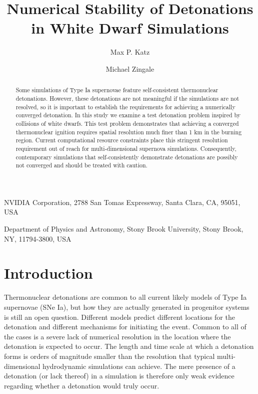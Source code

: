 \documentclass[twocolumn,numberedappendix,trackchanges]{../aastex62}
\begin{document}
\title{Numerical Stability of Detonations in White Dwarf Simulations}


\author{Max P. Katz}
\affiliation
{
  NVIDIA Corporation, 2788 San Tomas Expressway, Santa Clara, CA, 95051, USA
}

\author{Michael Zingale}
\affiliation
{
  Department of Physics and Astronomy, Stony Brook University, Stony Brook, NY, 11794-3800, USA
}



\begin{abstract}
Some simulations of Type Ia supernovae feature self-consistent thermonuclear
detonations. However, these detonations are not meaningful if the simulations
are not resolved, so it is important to establish the requirements for achieving
a numerically converged detonation. In this study we examine a test detonation
problem inspired by collisions of white dwarfs. This test problem demonstrates
that achieving a converged thermonuclear ignition requires spatial resolution
much finer than 1 km in the burning region. Current computational resource
constraints place this stringent resolution requirement out of reach for
multi-dimensional supernova simulations. Consequently, contemporary simulations
that self-consistently demonstrate detonations are possibly not converged
and should be treated with caution.
\end{abstract}

\section{Introduction}
\label{sec:introduction}

Thermonuclear detonations are common to all current likely models of Type Ia
supernovae (SNe Ia), but how they are actually generated in progenitor systems
is still an open question. Different models predict different locations for
the detonation and different mechanisms for initiating the event. Common to all
of the cases is a severe lack of numerical resolution in the location where the
detonation is expected to occur. The length and time scale at which a detonation
forms is orders of magnitude smaller than the resolution that typical multi-dimensional
hydrodynamic simulations can achieve. The mere presence of a detonation (or lack thereof)
in a simulation is therefore only weak evidence regarding whether a detonation would truly occur.
\end{document}
